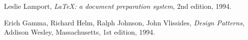 
\begin{thebibliography}{9}

  Leslie Lamport,
  \textit{\LaTeX: a document preparation system},
  2nd edition, 1994.
  
  Erich Gamma, Richard Helm, Ralph Johnson, John Vlissides,
  \textit{Design Patterns},
  Addison Wesley, Massachusetts,
  1st edition, 1994.

\end{thebibliography}